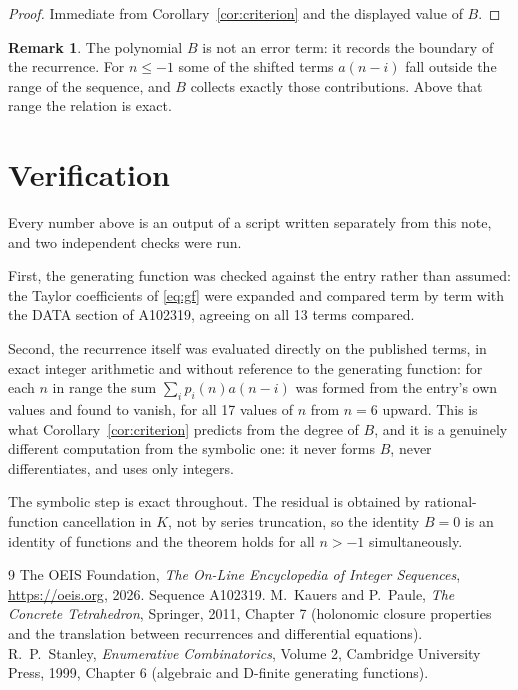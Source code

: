 \documentclass[11pt,a4paper]{article}
\theoremstyle{plain}
\theoremstyle{definition}
\newtheorem{remark}[theorem]{Remark}
\begin{document}
\begin{proof}
Immediate from Corollary~\ref{cor:criterion} and the displayed value of $B$.
\end{proof}

\begin{remark}
The polynomial $B$ is not an error term: it records the boundary of the recurrence. For
$n\le-1$ some of the shifted terms $a(n-i)$ fall outside the range of the sequence,
and $B$ collects exactly those contributions. Above that range the relation is exact.
\end{remark}

\section{Verification}

Every number above is an output of a script written separately from this note, and two
independent checks were run.

First, the generating function was checked against the entry rather than assumed: the
Taylor coefficients of \eqref{eq:gf} were expanded and compared term by term with the DATA
section of A102319, agreeing on all 13 terms compared.

Second, the recurrence itself was evaluated directly on the published terms, in exact
integer arithmetic and without reference to the generating function: for each $n$ in range
the sum $\sum_{i}p_{i}(n)a(n-i)$ was formed from the entry's own values and found to
vanish, for all 17 values of $n$ from $n=6$ upward. This is what
Corollary~\ref{cor:criterion} predicts from the degree of $B$, and it is a genuinely
different computation from the symbolic one: it never forms $B$, never differentiates, and
uses only integers.

The symbolic step is exact throughout. The residual is obtained by rational-function
cancellation in $K$, not by series truncation, so the identity $B=0$ is an
identity of functions and the theorem holds for all $n>-1$ simultaneously.

\begin{thebibliography}{9}
 The OEIS Foundation, \emph{The On-Line Encyclopedia of Integer Sequences},
\url{https://oeis.org}, 2026. Sequence A102319.
 M.~Kauers and P.~Paule, \emph{The Concrete Tetrahedron}, Springer, 2011,
Chapter 7 (holonomic closure properties and the translation between recurrences and
differential equations).
 R.~P.~Stanley, \emph{Enumerative Combinatorics}, Volume 2, Cambridge
University Press, 1999, Chapter 6 (algebraic and D-finite generating functions).
\end{thebibliography}
\end{document}
